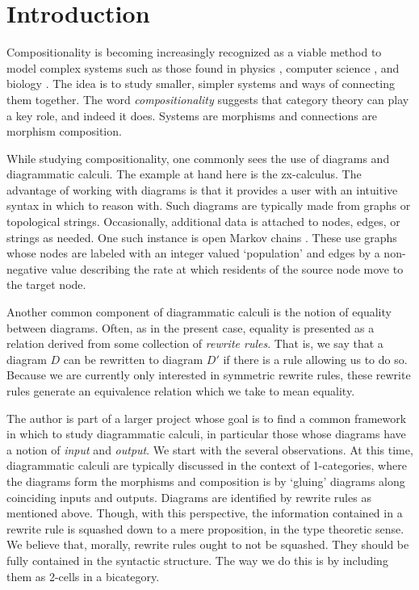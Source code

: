 \documentclass[./Catfying_zxCalc--Master.tex]{subfiles} %
\begin{document}
%

\section{Introduction}
\label{sec:Introduction}

Compositionality is becoming increasingly recognized as a viable method to model complex systems such as those found in 
physics \cite{AbramCoecke_CatSemanticQuantum}, 
computer science \cite{SassoneSobocinski_PetriNets}, 
and biology \cite{BaezFongPollard_CompMarkovProcesses}.  
The idea is to study smaller, simpler systems and ways of connecting them together.  The word \emph{compositionality} suggests that category theory can play a key role, and indeed it does.  Systems are morphisms and connections are morphism composition.   

While studying compositionality, one commonly sees the use of diagrams and diagrammatic calculi. The example at hand here is the zx-calculus.  The advantage of working with diagrams is that it provides a user with an intuitive syntax in which to reason with.  Such diagrams are typically made from graphs or topological strings.  Occasionally, additional data is attached to nodes, edges, or strings as needed. One such instance is open Markov chains
\cite{Pollard_OpenMarkov}. 
These use graphs whose nodes are labeled with an integer valued `population' and edges by a non-negative value describing the rate at which residents of the source node move to the target node. 

Another common component of diagrammatic calculi is the notion of equality between diagrams.  Often, as in the present case, equality is presented as a relation derived from some collection of \emph{rewrite rules}. That is, we say that a diagram $D$ can be rewritten to diagram $D'$ if there is a rule allowing us to do so.  Because we are currently only interested in symmetric rewrite rules, these rewrite rules generate an equivalence relation which we take to mean equality. 

The author is part of a larger project whose goal is to find a common framework in which to study diagrammatic calculi, in particular those whose diagrams have a notion of \emph{input} and \emph{output}. We start with the several observations. At this time, diagrammatic calculi are typically discussed in the context of 1-categories, where the diagrams form the morphisms and composition is by `gluing' diagrams along coinciding inputs and outputs. Diagrams are identified by rewrite rules as mentioned above. Though, with this perspective, the information contained in a rewrite rule is squashed down to a mere proposition, in the type theoretic sense. We believe that, morally, rewrite rules ought to not be squashed. They should be fully contained in the syntactic structure. The way we do this is by including them as 2-cells in a bicategory.  
\end{document}
